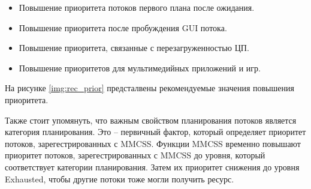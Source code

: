 \begin{itemize}
    \item Повышение приоритета потоков первого плана после ожидания.


    \item Повышение приоритета после пробуждения GUI потока.


    \item Повышение приоритета, связанные с перезагруженностью ЦП.


    \item Повышение приоритетов для мультимедийных приложений и игр.

\end{itemize}


На рисунке \ref{img:rec_prior} предсталвены рекомендуемые значения повышения приоритета.



Также стоит упомянуть, что важным свойством планирования потоков является категория планирования. Это -- первичный фактор, который определяет приоритет потоков, зарегестрированных с MMCSS. Функции MMCSS временно повышают приоритет потоков, зарегестрированных с MMCSS до уровня, который соответствует категории планирования. Затем их приоритет снижения до уровня Exhausted, чтобы другие потоки тоже могли получить ресурс.

